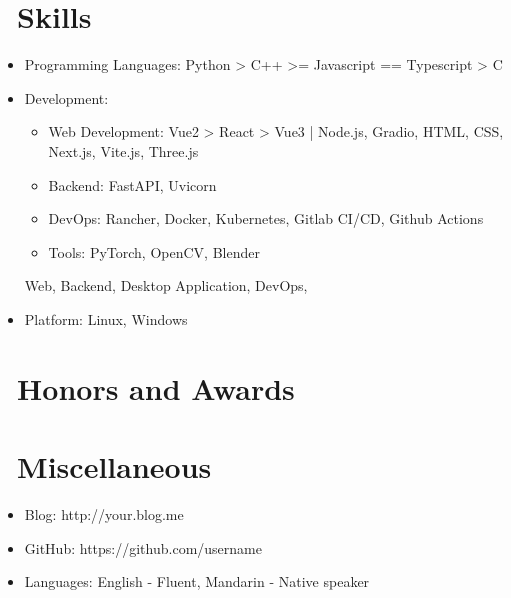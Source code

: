 \documentclass{resume}
\begin{document}
\section{\faCogs\ Skills}
\begin{itemize}[parsep=0.5ex]
  \item Programming Languages: Python > C++ >= Javascript == Typescript > C
  \item Development:
    \begin{itemize}
      \item Web Development: Vue2 > React > Vue3 | Node.js, Gradio, HTML, CSS, Next.js, Vite.js, Three.js
      \item Backend: FastAPI, Uvicorn
      \item DevOps: Rancher, Docker, Kubernetes, Gitlab CI/CD, Github Actions
      \item Tools: PyTorch, OpenCV, Blender
    \end{itemize}
  Web, Backend, Desktop Application, DevOps,
  \item Platform: Linux, Windows
\end{itemize}

\section{\faHeartO\ Honors and Awards}

\section{\faInfo\ Miscellaneous}
\begin{itemize}[parsep=0.5ex]
  \item Blog: http://your.blog.me
  \item GitHub: https://github.com/username
  \item Languages: English - Fluent, Mandarin - Native speaker
\end{itemize}

%
%
\end{document}
